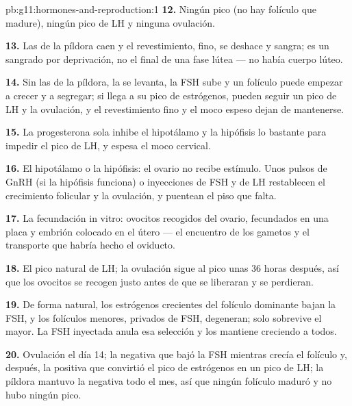 \begin{solution}{pb:g11:hormones-and-reproduction:1}
\textbf{12.} Ningún pico (no hay folículo que madure), ningún pico de
LH y ninguna ovulación.

\textbf{13.} Las  de la píldora caen y el revestimiento, fino,
se deshace y sangra; es un sangrado por deprivación, no el final de una
fase lútea --- no había cuerpo lúteo.

\textbf{14.} Sin las  de la píldora, la  se
levanta, la FSH sube y un folículo puede empezar a crecer y a segregar;
si llega a su pico de estrógenos, pueden seguir un pico de LH y la
ovulación, y el revestimiento fino y el moco espeso dejan de
mantenerse.

\textbf{15.} La progesterona sola inhibe el hipotálamo y la hipófisis
lo bastante para impedir el pico de LH, y espesa el moco cervical.

\textbf{16.} El hipotálamo o la hipófisis: el ovario no recibe
estímulo. Unos pulsos de GnRH (si la hipófisis funciona) o inyecciones
de FSH y de LH restablecen el crecimiento folicular y la ovulación, y
puentean el piso que falta.

\textbf{17.} La fecundación in vitro: ovocitos recogidos del ovario,
fecundados en una placa y embrión colocado en el útero --- el encuentro
de los gametos y el transporte que habría hecho el oviducto.

\textbf{18.} El pico natural de LH; la ovulación sigue al pico unas 36
horas después, así que los ovocitos se recogen justo antes de que se
liberaran y se perdieran.

\textbf{19.} De forma natural, los estrógenos crecientes del folículo
dominante bajan la FSH, y los folículos menores, privados de FSH,
degeneran; solo sobrevive el mayor. La FSH inyectada anula esa
selección y los mantiene creciendo a todos.

\textbf{20.} Ovulación el día 14; la  negativa que
bajó la FSH mientras crecía el folículo y, después, la positiva que
convirtió el pico de estrógenos en un pico de LH; la píldora mantuvo la
 negativa todo el mes, así que ningún folículo maduró
y no hubo ningún pico.
\end{solution}
